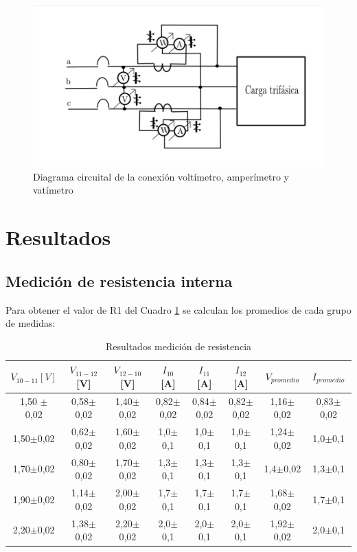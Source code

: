 \documentclass[11pt,letterpaper]{article}     %
\begin{document}
\begin{figure}[H]
	\centering
	\includegraphics[scale=0.2]{./recursos-Lab8/diagramaCircuitalmedicionPotenciaVoltajeCorriente.jpg}
	\caption{Diagrama circuital de la conexión voltímetro, amperímetro y vatímetro}
	\label{fig:diagramaDeConexion}
\end{figure}


\section{Resultados}
\subsection{Medición de resistencia interna}
Para obtener el valor de R1 del Cuadro \ref{cuadro medicion de resistencia} se calculan los promedios de cada grupo de medidas:
\begin{table}[H]
	\centering
	\caption{Resultados medición de resistencia}
	\label{cuadro medicion de resistencia}
	\begin{tabular}{|c|c|c|c|c|c|c|c|}
		\hline
		$V_{10-11} [V]$ &$ V_{11-12} $[V] &$ V_{12-10}$ [V] &$ I_{10}$ [A] & $I_{11}$ [A] &$ I_{12}$ [A] &$ V_{promedio}$ & $I_{promedio}$ \\ \hline
		1,50 $\pm$ 0,02 & 0,58$\pm$0,02 & 1,40$\pm$0,02 & 0,82$\pm$0,02 & 0,84$\pm$0,02 & 0,82$\pm$0,02 & 1,16$\pm$0,02 & 0,83$\pm$0,02 \\ \hline
		1,50$\pm$0,02 & 0,62$\pm$0,02 & 1,60$\pm$0,02 & 1,0$\pm$0,1 & 1,0$\pm$0,1 & 1,0$\pm$0,1 & 1,24$\pm$0,02 & 1,0$\pm$0,1 \\ \hline
		1,70$\pm$0,02 & 0,80$\pm$0,02 & 1,70$\pm$0,02 & 1,3$\pm$0,1 & 1,3$\pm$0,1 & 1,3$\pm$0,1 & 1,4$\pm$0,02 & 1,3$\pm$0,1 \\ \hline
		1,90$\pm$0,02 & 1,14$\pm$0,02 & 2,00$\pm$0,02 & 1,7$\pm$0,1 & 1,7$\pm$0,1 & 1,7$\pm$0,1 & 1,68$\pm$0,02 & 1,7$\pm$0,1 \\ \hline
		2,20$\pm$0,02 & 1,38$\pm$0,02 & 2,20$\pm$0,02 & 2,0$\pm$0,1 & 2,0$\pm$0,1 & 2,0$\pm$0,1 & 1,92$\pm$0,02 & 2,0$\pm$0,1 \\ \hline
	\end{tabular}
\end{table}
\end{document}
